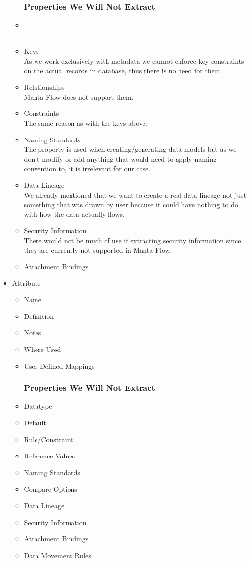 \begin{itemize}
\begin{itemize}
		\subsubsection{Properties We Will Not Extract}
		\item {} \\
		 \\
		\item Keys \\
		As we work exclusively with metadata we cannot enforce key constraints on the actual records in database, thus there is no need for them.
		\item Relationships \\
		Manta Flow does not support them.
		\item Constraints \\
		The same reason as with the keys above.
		\item Naming Standards \\ 
		The property is used when creating/generating data models but as we don't modify or add anything that would need to apply naming convention to, it is irrelevant for our case.
		\item Data Lineage \\
		We already mentioned that we want to create a real data lineage not just something that was drawn by user because it could have nothing to do with how the data actually flows.
		\item Security Information \\
		There would not be much of use if extracting security information since they are currently not supported in Manta Flow.
		\item Attachment Bindings \\
	\end{itemize}
	\item Attribute
	\begin{itemize}
		\item Name
		\item Definition
		\item Notes
		\item Where Used
		\item User-Defined Mappings
		\subsubsection{Properties We Will Not Extract}
		\item Datatype
		\item Default
		\item Rule/Constraint
		\item Reference Values
		\item Naming Standards
		\item Compare Options
		\item Data Lineage
		\item Security Information
		\item Attachment Bindings
		\item Data Movement Rules
	\end{itemize}

\end{itemize}
